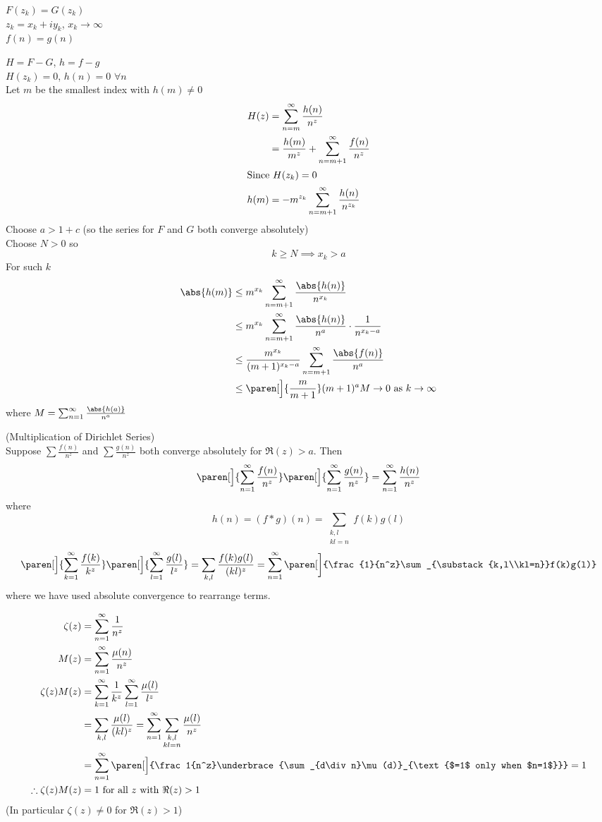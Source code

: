 $F(z_k)=G(z_k)$ \\
$z_k=x_k+iy_k$, $x_k\to\infty$ \\
$f(n)=g(n)$

$H=F-G$, $h=f-g$ \\
$H(z_k)=0$, $h(n)=0$ $\forall n$ \\
Let $m$ be the smallest index with $h(m)\neq0$
\begin{align*}
H(z) &= \sum_{n=m}^\infty\frac{h(n)}{n^z} \\
&= \frac{h(m)}{m^z} + \sum_{n=m+1}^\infty \frac{f(n)}{n^z} \\ \intertext{Since $H(z_k)=0$}
h(m) &= -m^{z_k}\sum_{n=m+1}^\infty \frac{h(n)}{n^{z_k}}
\end{align*}
Choose $a>1+c$ (so the series for $F$ and $G$ both converge absolutely) \\
Choose $N>0$ so
\[ k\geq N \implies x_k>a \]
For such $k$
\begin{align*}
\abs{h(m)} &\leq m^{x_k}\sum_{n=m+1}^\infty\frac{\abs{h(n)}}{n^{x_k}} \\
&\leq m^{x_k}\sum_{n=m+1}^\infty \frac{\abs{h(n)}}{n^a}\cdot\frac{1}{n^{x_k-a}} \\
&\leq \frac{m^{x_k}}{(m+1)^{x_k-a}}\sum_{n=m+1}^\infty \frac{\abs{f(n)}}{n^a} \\
&\leq \paren[\Big]{\frac{m}{m+1}}(m+1)^a M \to 0 \text{ as } k\to\infty
\end{align*}
where $M=\sum_{n=1}^\infty\frac{\abs{h(a)}}{n^a}$

\thm (Multiplication of Dirichlet Series) \\
Suppose $\sum\frac{f(n)}{n^z}$ and $\sum\frac{g(n)}{n^z}$ both converge absolutely for $\Re(z)>a$.  Then
\[ \paren[\Big]{\sum_{n=1}^\infty\frac{f(n)}{n^z}}\paren[\Big]{\sum_{n=1}^\infty\frac{g(n)}{n^z}} = \sum_{n=1}^\infty \frac{h(n)}{n^z} \]
where
\[ h(n) = (f*g)(n) = \sum_{\substack{k,l\\kl=n}}f(k)g(l) \]
\pf
\[ \paren[\Big]{\sum_{k=1}^\infty\frac{f(k)}{k^z}} \paren[\Big]{\sum_{l=1}^\infty\frac{g(l)}{l^z}} = \sum_{k,l}\frac{f(k)g(l)}{(kl)^z} = \sum_{n=1}^\infty \paren[\bigg]{\frac{1}{n^z}\sum_{\substack{k,l\\kl=n}}f(k)g(l)}  \]
where we have used absolute convergence to rearrange terms.

\eg
\begin{align*}
\zeta(z) &= \sum_{n=1}^\infty \frac{1}{n^z} \\
M(z) &= \sum_{n=1}^\infty \frac{\mu(n)}{n^z} \\
\zeta(z)M(z) &= \sum_{k=1}^\infty\frac1{k^z}\sum_{l=1}^\infty\frac{\mu(l)}{l^z} \\
&= \sum_{k,l}\frac{\mu(l)}{(kl)^z} = \sum_{n=1}^\infty\sum_{\substack{k,l\\kl=n}}\frac{\mu(l)}{n^z} \\
&= \sum_{n=1}^\infty \paren[\Big]{\frac1{n^z}\underbrace{\sum_{d\div n}\mu(d)}_{\text{$=1$ only when $n=1$}}} = 1 \\
\therefore \zeta(z) M(z) &= 1 \text{ for all $z$ with $\Re(z)>1$}
\end{align*}
(In particular $\zeta(z)\neq0$ for $\Re(z)>1$)

